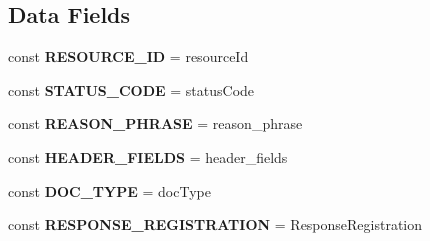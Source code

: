 \subsection*{Data Fields}
\begin{DoxyCompactItemize}
\item 
\hypertarget{interface_able_polecat___message___response_interface_a3818580b7ba93b54cc84d9d71d1c0816}{}const {\bfseries R\+E\+S\+O\+U\+R\+C\+E\+\_\+\+I\+D} = \textquotesingle{}resource\+Id\textquotesingle{}\label{interface_able_polecat___message___response_interface_a3818580b7ba93b54cc84d9d71d1c0816}

\item 
\hypertarget{interface_able_polecat___message___response_interface_a3e898337cc7565832a3dd17d78c85bd6}{}const {\bfseries S\+T\+A\+T\+U\+S\+\_\+\+C\+O\+D\+E} = \textquotesingle{}status\+Code\textquotesingle{}\label{interface_able_polecat___message___response_interface_a3e898337cc7565832a3dd17d78c85bd6}

\item 
\hypertarget{interface_able_polecat___message___response_interface_a242fb9c88e184da9d6e943f108bfe48d}{}const {\bfseries R\+E\+A\+S\+O\+N\+\_\+\+P\+H\+R\+A\+S\+E} = \textquotesingle{}reason\+\_\+phrase\textquotesingle{}\label{interface_able_polecat___message___response_interface_a242fb9c88e184da9d6e943f108bfe48d}

\item 
\hypertarget{interface_able_polecat___message___response_interface_a5d074c0b0ac2f85a6366e50f5fd1bb5c}{}const {\bfseries H\+E\+A\+D\+E\+R\+\_\+\+F\+I\+E\+L\+D\+S} = \textquotesingle{}header\+\_\+fields\textquotesingle{}\label{interface_able_polecat___message___response_interface_a5d074c0b0ac2f85a6366e50f5fd1bb5c}

\item 
\hypertarget{interface_able_polecat___message___response_interface_ad8fe6d3a3895dd36e483eab9f040f615}{}const {\bfseries D\+O\+C\+\_\+\+T\+Y\+P\+E} = \textquotesingle{}doc\+Type\textquotesingle{}\label{interface_able_polecat___message___response_interface_ad8fe6d3a3895dd36e483eab9f040f615}

\item 
\hypertarget{interface_able_polecat___message___response_interface_aed3b720ed37acbd9a9d10c06d02846e4}{}const {\bfseries R\+E\+S\+P\+O\+N\+S\+E\+\_\+\+R\+E\+G\+I\+S\+T\+R\+A\+T\+I\+O\+N} = \textquotesingle{}Response\+Registration\textquotesingle{}\label{interface_able_polecat___message___response_interface_aed3b720ed37acbd9a9d10c06d02846e4}


\end{DoxyCompactItemize}
